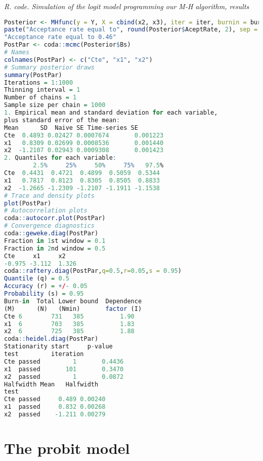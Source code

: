 \begin{tcolorbox}[enhanced,width=4.67in,center upper,
	fontupper=\large\bfseries,drop shadow southwest,sharp corners]
	\textit{R. code. Simulation of the logit model programming our M-H algorithm, results}
	\begin{VF}
		\begin{lstlisting}[language=R]		
Posterior <- MHfunc(y = Y, X = cbind(x2, x3), iter = iter, burnin = burnin, thin = thin) # Running our M-H function changing some default parameters.
paste("Acceptance rate equal to", round(Posterior$AceptRate, 2), sep = " ")
"Acceptance rate equal to 0.46"
PostPar <- coda::mcmc(Posterior$Bs)
# Names
colnames(PostPar) <- c("Cte", "x1", "x2")
# Summary posterior draws
summary(PostPar)
Iterations = 1:1000
Thinning interval = 1 
Number of chains = 1 
Sample size per chain = 1000 
1. Empirical mean and standard deviation for each variable,
plus standard error of the mean:
Mean      SD  Naive SE Time-series SE
Cte  0.4893 0.02427 0.0007674       0.001223
x1   0.8309 0.02699 0.0008536       0.001440
x2  -1.2107 0.02943 0.0009308       0.001423
2. Quantiles for each variable:
		2.5%     25%     50%     75%   97.5%
Cte  0.4431  0.4721  0.4899  0.5059  0.5344
x1   0.7817  0.8123  0.8305  0.8505  0.8833
x2  -1.2665 -1.2309 -1.2107 -1.1911 -1.1538
# Trace and density plots
plot(PostPar)
# Autocorrelation plots
coda::autocorr.plot(PostPar)
# Convergence diagnostics
coda::geweke.diag(PostPar)
Fraction in 1st window = 0.1
Fraction in 2nd window = 0.5 
Cte     x1     x2 
-0.975 -3.112  1.326 
coda::raftery.diag(PostPar,q=0.5,r=0.05,s = 0.95)
Quantile (q) = 0.5
Accuracy (r) = +/- 0.05
Probability (s) = 0.95 
Burn-in  Total Lower bound  Dependence
(M)      (N)   (Nmin)       factor (I)
Cte 6        731   385          1.90      
x1  6        703   385          1.83      
x2  6        725   385          1.88 
coda::heidel.diag(PostPar)
Stationarity start     p-value
test         iteration        
Cte passed         1       0.4436 
x1  passed       101       0.3470 
x2  passed         1       0.0872 
Halfwidth Mean   Halfwidth
test                      
Cte passed     0.489 0.00240  
x1  passed     0.832 0.00268  
x2  passed    -1.211 0.00279
\end{lstlisting}
	\end{VF}
\end{tcolorbox} 

\section{The probit model}\label{sec63}

